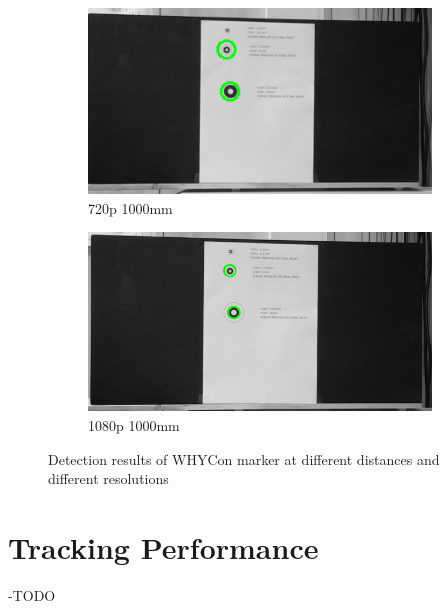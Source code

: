 \begin{figure}
    \begin{subfigure}[b]{.45\linewidth}
        \includegraphics[width=\linewidth]{bilder/project/720p1000mm.png}
        \caption{720p 1000mm}\label{fig:720p1000mm}
    \end{subfigure}
    \begin{subfigure}[b]{.45\linewidth}
        \includegraphics[width=\linewidth]{bilder/project/1080p1000mm.png}
        \caption{1080p 1000mm}\label{fig:1080p1000mm}
    \end{subfigure}
    \caption{Detection results of WHYCon marker at different distances and different resolutions}
    \label{fig:detection_results}
\end{figure}


\section{Tracking Performance}

-TODO